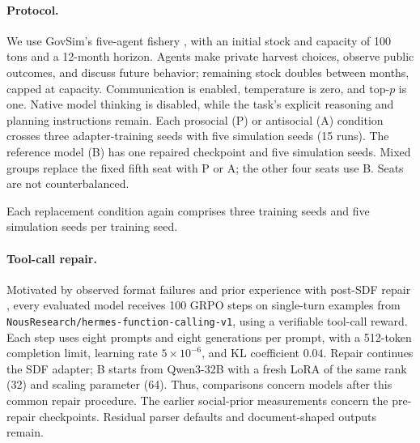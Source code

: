 \documentclass{article} %
\begin{document}
\paragraph{Protocol.}
We use GovSim's five-agent fishery \citep{piatti2024cooperate}, with an
initial stock and capacity of 100 tons and a 12-month horizon. Agents make
private harvest choices, observe public outcomes, and discuss future behavior;
remaining stock doubles between months, capped at capacity. Communication is
enabled, temperature is zero, and top-$p$ is one. Native model thinking is
disabled, while the task's explicit reasoning and planning instructions remain.
Each prosocial (P) or antisocial (A) condition crosses three adapter-training
seeds with five simulation seeds (15 runs). The reference model (B) has one
repaired checkpoint and five simulation seeds. Mixed groups replace the fixed
fifth seat with P or A; the other four seats use B. Seats are not counterbalanced.

Each replacement condition again comprises three training seeds and five simulation seeds per training seed.

\paragraph{Tool-call repair.}
Motivated by observed format failures and prior experience with post-SDF repair \citep{hojmark2026contrastive}, every evaluated model receives 100 GRPO steps on single-turn examples from \texttt{NousResearch/hermes-function-calling-v1}, using a verifiable tool-call reward. Each step uses eight prompts and eight generations per prompt, with a 512-token completion limit, learning rate $5\times10^{-6}$, and KL coefficient $0.04$. Repair continues the SDF adapter; B starts from Qwen3-32B with a fresh LoRA of the same rank (32) and scaling parameter (64). Thus, comparisons concern models after this common repair procedure. The earlier social-prior measurements concern the pre-repair checkpoints. Residual parser defaults and document-shaped outputs remain.
\end{document}

